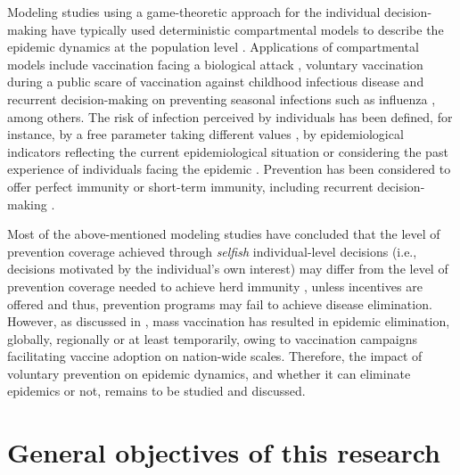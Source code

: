 Modeling studies using a game-theoretic approach for the individual decision-making have typically used deterministic compartmental models to describe the epidemic dynamics at the population level \cite[]{Bauch2003,Bauch2004,Breban2007,DOnofrio2007,Vardavas2007,Galvani2007,Breban2011,Liu2012}. Applications of compartmental models include vaccination facing a biological attack \cite[]{Bauch2003}, voluntary vaccination during a public scare of vaccination against childhood infectious disease \cite[]{Bauch2004} and recurrent decision-making on preventing seasonal infections such as influenza \cite[]{Breban2007,Galvani2007}, among others. The risk of infection perceived by individuals has been defined, for instance, by a free parameter taking different values \cite[]{Bauch2004}, by epidemiological indicators reflecting the current epidemiological situation \cite[]{Bauch2003,DOnofrio2007,Breban2011,Liu2012} or considering the past experience of individuals facing the epidemic \cite[]{Breban2007,Vardavas2007,DOnofrio2007}. Prevention has been considered to offer perfect immunity \cite[]{Bauch2003,Bauch2004,DOnofrio2007} or short-term immunity, including recurrent decision-making \cite[]{Breban2007}. 

Most of the above-mentioned modeling studies have concluded that the level of prevention coverage achieved through \emph{selfish} individual-level decisions  (i.e., decisions motivated by the individual's own interest) may differ from the level of prevention coverage needed to achieve herd immunity \cite[]{Bauch2003,Bauch2004,Breban2007,Galvani2007,Breban2011}, unless incentives are offered \cite[]{Vardavas2007,Liu2012} and thus, prevention programs may fail to achieve disease elimination. %
However, as discussed in , mass vaccination has resulted in epidemic elimination, globally, regionally or at least temporarily, owing to vaccination campaigns facilitating vaccine adoption on nation-wide scales. Therefore, the impact of voluntary prevention on epidemic dynamics, and whether it can eliminate epidemics or not, remains to be studied and discussed.

\section{General objectives of this research}
\label{Intro:Objectives} 

